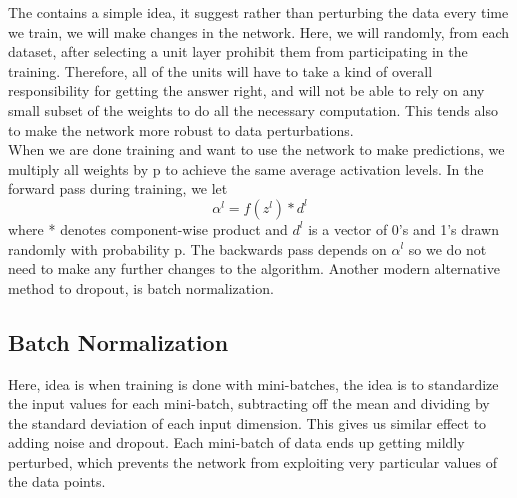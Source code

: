 The contains a simple idea, it suggest rather than perturbing the data every time we train, we will make changes in the
network. Here, we will randomly, from each dataset, after selecting a unit layer prohibit them from participating  in the training. Therefore, all of the units will have to take a 
kind of overall responsibility for getting the answer right, and will not be able to rely
on any small subset of the weights to do all the necessary computation. This tends also to
make the network more robust to data perturbations.\\
When we are done training and want to use the network to make predictions, we multiply all weights by p to achieve the same average activation levels. In the forward pass during training, we let\\
\begin{equation}
    \alpha^l = f(z^l) * d^l
\end{equation}
where * denotes component-wise product and $d^l$ is a vector of 0’s and 1’s drawn randomly
with probability p. The backwards pass depends on $\alpha^l$ so we do not need to make any
further changes to the algorithm.
Another modern alternative method to dropout, is batch normalization.\\
\subsection{Batch Normalization}

Here, idea is when training is done with mini-batches, the idea is to standardize the input values for each mini-batch, subtracting off the mean and dividing by the standard deviation of each input dimension. This gives us similar effect to adding noise and dropout. Each mini-batch of data ends up getting mildly perturbed, which prevents the network from exploiting very particular values of the data points.\\


